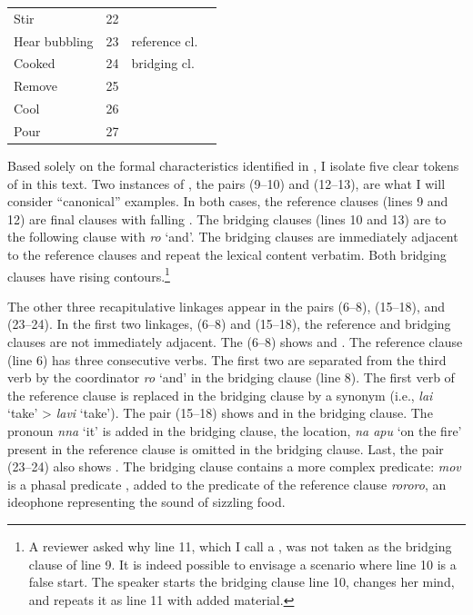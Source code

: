 \documentclass[output=paper]{LSP/langsci}
\begin{document}
\begin{table}[]
\begin{tabular}{lcll}
 Stir          & 22     &                &       \\
Hear bubbling   & 23     & reference cl.                  &                 \\
Cooked          & 24     & bridging cl. &                              \\
Remove          & 25     &                 &                 \\
Cool            & 26     &                 &                 \\
Pour            & 27     &                 &                
\end{tabular}
\end{table}

Based solely on the formal characteristics identified in , I isolate five clear tokens of  in this text. Two instances of , the pairs (9--10) and (12--13), are what I will consider ``canonical'' examples. In both cases, the reference clauses (lines 9 and 12) are final clauses with falling .  The bridging clauses (lines 10 and 13) are  to the following clause with \textit{ro} `and'. The bridging clauses are immediately adjacent to the reference clauses and repeat the lexical content verbatim. Both bridging clauses have rising  contours.\footnote{A reviewer asked why line 11, which I call a , was not taken as the bridging clause of line 9. It is indeed possible to envisage a scenario where line 10 is a false start. The speaker starts the bridging clause line 10, changes her mind, and repeats it as line 11 with added  material.}  

The other three recapitulative linkages appear in the pairs (6--8), (15--18), and (23--24). In the first two linkages, (6--8) and (15--18), the reference and bridging clauses are not immediately adjacent. The  (6--8) shows  and . The reference clause (line 6) has three consecutive verbs. The first two are separated from the third verb by the coordinator \textit{ro} `and' in the bridging clause (line 8). The first verb of the reference clause is replaced in the bridging clause by a synonym (i.e., \textit{lai} `take' > \textit{lavi} `take'). The pair (15--18) shows  and  in the bridging clause. The pronoun \textit{nna} `it' is added in the bridging clause, the location, \textit{na apu} `on the fire' present in the reference clause is omitted in the bridging clause. Last, the pair (23--24) also shows . The bridging clause contains a more complex predicate: \textit{mov} is a phasal predicate \citep[][342]{guerin11}, added to the predicate of the reference clause \textit{rororo}, an ideophone representing the sound of sizzling food. 
\end{document}

